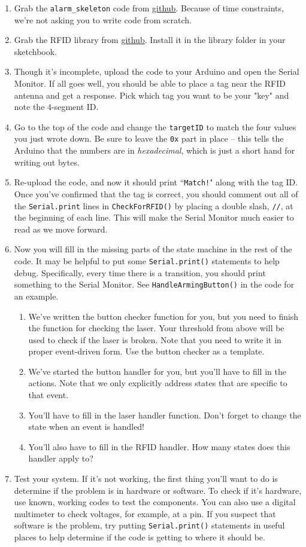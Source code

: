 \documentclass[11pt]{article} %
\begin{document}
\begin{enumerate}
\item Grab the \verb|alarm_skeleton| code from \href{https://github.com/gcl8a/arduino.advanced}{\underline{github}}. Because of time constraints, we're not asking you to write code from scratch.
\item Grab the RFID library from \href{https://github.com/gcl8a/Adafruit-PN532}{\underline{github}}. Install it in the library folder in your sketchbook.
\item Though it's incomplete, upload the code to your Arduino and open the Serial Monitor. If all goes well, you should be able to place a tag near the RFID antenna and get a response. Pick which tag you want to be your "key" and note the 4-segment ID.
\item Go to the top of the code and change the \verb|targetID| to match the four values you just wrote down. Be sure to leave the \verb|0x| part in place -- this tells the Arduino that the numbers are in \emph{hexadecimal}, which is just a short hand for writing out bytes.
\item Re-upload the code, and now it should print ``\verb|Match!|" along with the tag ID. Once you've confirmed that the tag is correct, you should comment out all of the \verb|Serial.print| lines in \verb|CheckForRFID()| by placing a double slash, \verb|//|, at the beginning of each line. This will make the Serial Monitor much easier to read as we move forward.
\item Now you will fill in the missing parts of the state machine in the rest of the code. It may be helpful to put some \verb|Serial.print()| statements to help debug. Specifically, every time there is a transition, you should print something to the Serial Monitor. See \verb|HandleArmingButton()| in the code for an example.
\begin{enumerate}
    \item We've written the button checker function for you, but you need to finish the function for checking the laser. Your threshold from above will be used to check if the laser is broken. Note that you need to write it in proper event-driven form. Use the button checker as a template.
    \item We've started the button handler for you, but you'll have to fill in the actions. Note that we only explicitly address states that are specific to that event.
    \item You'll have to fill in the laser handler function. Don't forget to change the state when an event is handled!
    \item You'll also have to fill in the RFID handler. How many states does this handler apply to?
\end{enumerate}
\item Test your system. If it's not working, the first thing you'll want to do is determine if the problem is in hardware or software. To check if it's hardware, use known, working codes to test the components. You can also use a digital multimeter to check voltages, for example, at a pin. If you suspect that software is the problem, try putting \verb|Serial.print()| statements in useful places to help determine if the code is getting to where it should be.


\end{enumerate}
\end{document}
